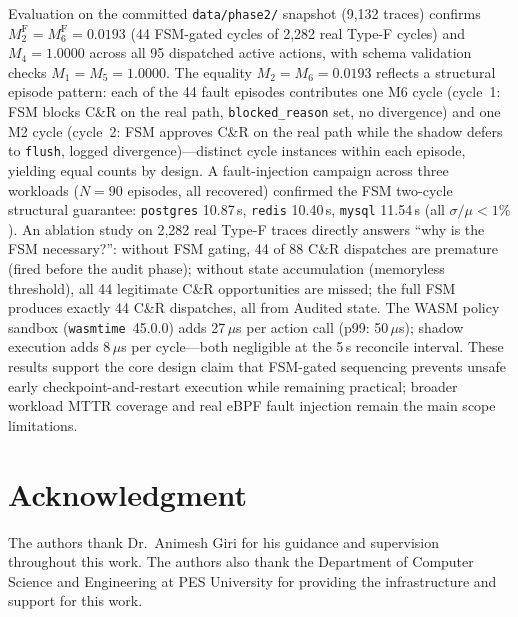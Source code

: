 \documentclass[conference]{IEEEtran}
\begin{document}
Evaluation on the committed \texttt{data/phase2/} snapshot (9,132 traces) confirms $M_2^\mathrm{F} = M_6^\mathrm{F} = 0.0193$ (44 FSM-gated cycles of 2,282 real Type-F cycles) and $M_4 = 1.0000$ across all 95 dispatched active actions, with schema validation checks $M_1 = M_5 = 1.0000$. The equality $M_2 = M_6 = 0.0193$ reflects a structural episode pattern: each of the 44 fault episodes contributes one M6 cycle (cycle~1: FSM blocks C\&R on the real path, \texttt{blocked\_reason} set, no divergence) and one M2 cycle (cycle~2: FSM approves C\&R on the real path while the shadow defers to \texttt{flush}, logged divergence)---distinct cycle instances within each episode, yielding equal counts by design. A fault-injection campaign across three workloads ($N = 90$ episodes, all recovered) confirmed the FSM two-cycle structural guarantee: \texttt{postgres} 10.87\,s, \texttt{redis} 10.40\,s, \texttt{mysql} 11.54\,s (all $\sigma/\mu < 1\%$). An ablation study on 2,282 real Type-F traces directly answers ``why is the FSM necessary?'': without FSM gating, 44 of 88 C\&R dispatches are premature (fired before the audit phase); without state accumulation (memoryless threshold), all 44 legitimate C\&R opportunities are missed; the full FSM produces exactly 44 C\&R dispatches, all from Audited state. The WASM policy sandbox (\texttt{wasmtime}~45.0.0) adds 27\,$\mu$s per action call (p99: 50\,$\mu$s); shadow execution adds 8\,$\mu$s per cycle---both negligible at the 5\,s reconcile interval. These results support the core design claim that FSM-gated sequencing prevents unsafe early checkpoint-and-restart execution while remaining practical; broader workload MTTR coverage and real eBPF fault injection remain the main scope limitations.

\section*{Acknowledgment}

The authors thank Dr.\ Animesh Giri for his guidance and supervision throughout this work. The authors also thank the Department of Computer Science and Engineering at PES University for providing the infrastructure and support for this work.
\end{document}
